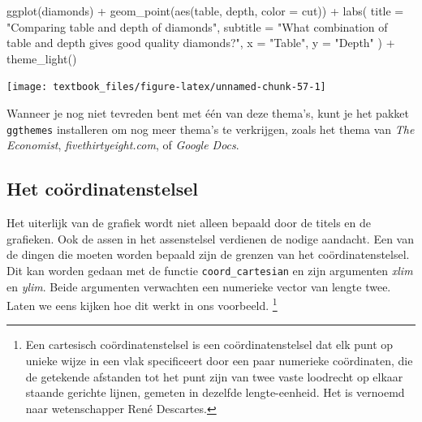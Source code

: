 \documentclass[]{tufte-book}
\newenvironment{Shaded}{}{}
\newcommand{\AttributeTok}[1]{\textcolor[rgb]{0.49,0.56,0.16}{#1}}
\newcommand{\FunctionTok}[1]{\textcolor[rgb]{0.02,0.16,0.49}{#1}}
\newcommand{\NormalTok}[1]{#1}
\newcommand{\SpecialCharTok}[1]{\textcolor[rgb]{0.25,0.44,0.63}{#1}}
\newcommand{\StringTok}[1]{\textcolor[rgb]{0.25,0.44,0.63}{#1}}
\begin{document}
\begin{Shaded}
\begin{Highlighting}[]
\FunctionTok{ggplot}\NormalTok{(diamonds) }\SpecialCharTok{+}
  \FunctionTok{geom\_point}\NormalTok{(}\FunctionTok{aes}\NormalTok{(table, depth, }\AttributeTok{color =}\NormalTok{ cut)) }\SpecialCharTok{+}
  \FunctionTok{labs}\NormalTok{(}
    \AttributeTok{title =} \StringTok{"Comparing table and depth of diamonds"}\NormalTok{,}
    \AttributeTok{subtitle =} \StringTok{"What combination of table and depth gives good quality diamonds?"}\NormalTok{,}
    \AttributeTok{x =} \StringTok{"Table"}\NormalTok{,}
    \AttributeTok{y =} \StringTok{"Depth"}
\NormalTok{  ) }\SpecialCharTok{+}
  \FunctionTok{theme\_light}\NormalTok{()}
\end{Highlighting}
\end{Shaded}

\texttt{[image: textbook\_files/figure-latex/unnamed-chunk-57-1]}

Wanneer je nog niet tevreden bent met één van deze thema's, kunt je het pakket \texttt{ggthemes} installeren om nog meer thema's te verkrijgen, zoals het thema van \emph{The Economist}, \emph{fivethirtyeight.com}, of \emph{Google Docs}.

\hypertarget{het-couxf6rdinatenstelsel}{%
\subsection{Het coördinatenstelsel}\label{het-couxf6rdinatenstelsel}}

Het uiterlijk van de grafiek wordt niet alleen bepaald door de titels en de grafieken. Ook de assen in het assenstelsel verdienen de nodige aandacht. Een van de dingen die moeten worden bepaald zijn de grenzen van het coördinatenstelsel. Dit kan worden gedaan met de functie \texttt{coord\_cartesian} en zijn argumenten \emph{xlim} en \emph{ylim}. Beide argumenten verwachten een numerieke vector van lengte twee. Laten we eens kijken hoe dit werkt in ons voorbeeld. \footnote{Een cartesisch coördinatenstelsel is een coördinatenstelsel dat elk punt op unieke wijze in een vlak specificeert door een paar numerieke coördinaten, die de getekende afstanden tot het punt zijn van twee vaste loodrecht op elkaar staande gerichte lijnen, gemeten in dezelfde lengte-eenheid. Het is vernoemd naar wetenschapper René Descartes.}
\end{document}
